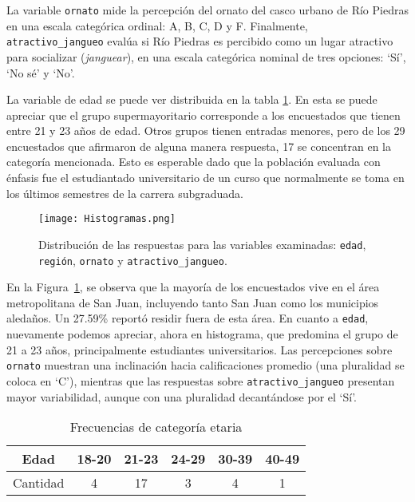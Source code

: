 \documentclass[11pt]{article}
\begin{document}
La variable \texttt{ornato} mide la percepción del ornato del casco urbano de Río Piedras en una escala categórica ordinal: A, B, C, D y F. Finalmente, \texttt{atractivo\_jangueo} evalúa si Río Piedras es percibido como un lugar atractivo para socializar (\textit{janguear}), en una escala categórica nominal de tres opciones: `Sí', `No sé' y `No'.

La variable de edad se puede ver distribuida en la tabla \ref{tab:edad}. En esta se puede apreciar que el grupo supermayoritario corresponde a los encuestados que tienen entre 21 y 23 años de edad. Otros grupos tienen entradas menores, pero de los 29 encuestados que afirmaron de alguna manera respuesta, 17 se concentran en la categoría mencionada. Esto es esperable dado que la población evaluada con énfasis fue el estudiantado universitario de un curso que normalmente se toma en los últimos semestres de la carrera subgraduada.

\begin{figure}[ht!]
    \centering
    \texttt{[image: Histogramas.png]}
    \caption{Distribución de las respuestas para las variables examinadas: \texttt{edad}, \texttt{región}, \texttt{ornato} y \texttt{atractivo\_jangueo}.}
    \label{fig:histogramas}
\end{figure}


En la Figura~\ref{fig:histogramas}, se observa que la mayoría de los encuestados vive en el área metropolitana de San Juan, incluyendo tanto San Juan como los municipios aledaños. Un 27.59\% reportó residir fuera de esta área. En cuanto a \texttt{edad}, nuevamente podemos apreciar, ahora en histograma, que predomina el grupo de 21 a 23 años, principalmente estudiantes universitarios. Las percepciones sobre \texttt{ornato} muestran una inclinación hacia calificaciones promedio (una pluralidad se coloca en `C'), mientras que las respuestas sobre \texttt{atractivo\_jangueo} presentan mayor variabilidad, aunque con una pluralidad decantándose por el `Sí'.

\begin{table}
    \centering
    \begin{tabular}{|c|c|c|c|c|c|} \hline 
         Edad&  18-20&  21-23&  24-29&  30-39& 40-49\\ \hline 
         Cantidad&  4&  17&  3&  4& 1\\ \hline
    \end{tabular}
    \caption{Frecuencias de categoría etaria}
    \label{tab:edad}
\end{table}
\end{document}
